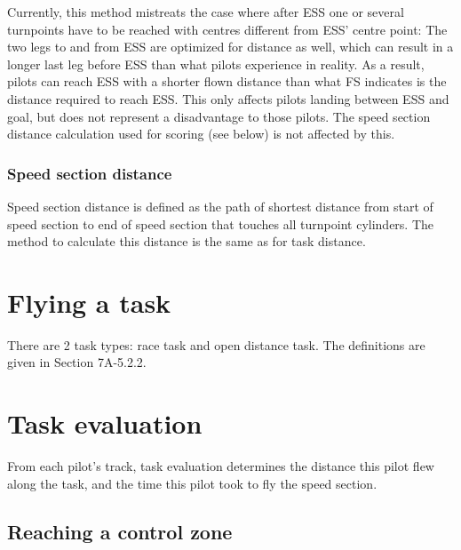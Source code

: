 \documentclass{article}
\begin{document}
Currently, this method mistreats the case where after ESS one or several
turnpoints have to be reached with centres different from ESS’ centre point:
The two legs to and from ESS are optimized for distance as well, which can
result in a longer last leg before ESS than what pilots experience in reality.
As a result, pilots can reach ESS with a shorter flown distance than what FS
indicates is the distance required to reach ESS. This only affects pilots
landing between ESS and goal, but does not represent a disadvantage to those
pilots. The speed section distance calculation used for scoring (see below) is
not affected by this.

\subsubsection{Speed section distance}
Speed section distance is defined as the path of shortest distance from start
of speed section to end of speed section that touches all turnpoint cylinders.
The method to calculate this distance is the same as for task distance.

\newpage
\section{Flying a task}
\label{sec:flying-a-task}
There are 2 task types: race task and open distance task. The definitions are
given in Section 7A-5.2.2.

\newpage
\section{Task evaluation}
\label{sec:task-evaluation}
From each pilot’s track, task evaluation determines the distance this pilot
flew along the task, and the time this pilot took to fly the speed section.

\subsection{Reaching a control zone}
\end{document}
